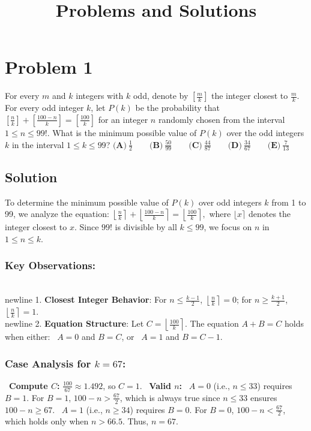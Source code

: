 \documentclass{article}
\title{Problems and Solutions}
\date{}
\begin{document}
\maketitle

\section*{Problem 1}
For every \(m\) and \(k\) integers with \(k\) odd, denote by \(\left[\frac{m}{k}\right]\) the integer closest to \(\frac{m}{k}\). For every odd integer \(k\), let \(P(k)\) be the probability that
\(\left[\frac{n}{k}\right] + \left[\frac{100 - n}{k}\right] = \left[\frac{100}{k}\right]\)
for an integer \(n\) randomly chosen from the interval \(1 \leq n \leq 99!\). What is the minimum possible value of \(P(k)\) over the odd integers \(k\) in the interval \(1 \leq k \leq 99\)?
\(\textbf{(A)}\ \frac{1}{2} \qquad \textbf{(B)}\ \frac{50}{99} \qquad \textbf{(C)}\ \frac{44}{87} \qquad \textbf{(D)}\  \frac{34}{67} \qquad \textbf{(E)}\  \frac{7}{13}\)

\subsection*{Solution}
To determine the minimum possible value of \( P(k) \) over odd integers \( k \) from 1 to 99, we analyze the equation:
\(
\left\lfloor \frac{n}{k} \right\rceil + \left\lfloor \frac{100 - n}{k} \right\rceil = \left\lfloor \frac{100}{k} \right\rceil,
\)
where \( \lfloor x \rceil \) denotes the integer closest to \( x \). Since \( 99! \) is divisible by all \( k \leq 99 \), we focus on \( n \) in \( 1 \leq n \leq k \).

\subsubsection*{Key Observations:}
\\newline 1. \textbf{Closest Integer Behavior}: For \( n \leq \frac{k-1}{2} \), \( \left\lfloor \frac{n}{k} \right\rceil = 0 \); for \( n \geq \frac{k+1}{2} \), \( \left\lfloor \frac{n}{k} \right\rceil = 1 \).
\\newline 2. \textbf{Equation Structure}: Let \( C = \left\lfloor \frac{100}{k} \right\rceil \). The equation \( A + B = C \) holds when either:
\noindent \textbullet\ \( A = 0 \) and \( B = C \), or
\noindent \textbullet\ \( A = 1 \) and \( B = C - 1 \).

\subsubsection*{Case Analysis for \( k = 67 \):}
\noindent \textbullet\ \textbf{Compute \( C \):} \( \frac{100}{67} \approx 1.492 \), so \( C = 1 \).
\noindent \textbullet\ \textbf{Valid \( n \):}
\noindent \textbullet\ \( A = 0 \) (i.e., \( n \leq 33 \)) requires \( B = 1 \). For \( B = 1 \), \( 100 - n > \frac{67}{2} \), which is always true since \( n \leq 33 \) ensures \( 100 - n \geq 67 \).
\noindent \textbullet\ \( A = 1 \) (i.e., \( n \geq 34 \)) requires \( B = 0 \). For \( B = 0 \), \( 100 - n < \frac{67}{2} \), which holds only when \( n > 66.5 \). Thus, \( n = 67 \).
\end{document}
